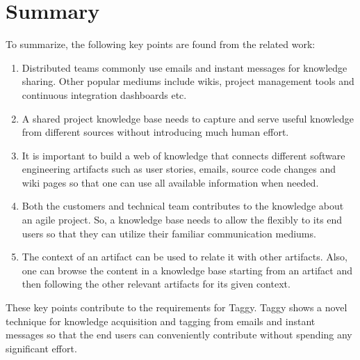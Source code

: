 \section{Summary}
To summarize, the following key points are found from the related work:
\begin{enumerate}
	\item Distributed teams commonly use emails and instant messages for knowledge sharing. Other popular mediums include wikis, project management tools and continuous integration dashboards etc.
	\item A shared project knowledge base needs to capture and serve useful knowledge from different sources without introducing much human effort.
	\item It is important to build a web of knowledge that connects different software engineering artifacts such as user stories, emails, source code changes and wiki pages so that one can use all available information when needed.
	\item Both the customers and technical team contributes to the knowledge about an agile project. So, a knowledge base needs to allow the flexibly to its end users so that they can utilize their familiar communication mediums.
	\item The context of an artifact can be used to relate it with other artifacts. Also, one can browse the content in a knowledge base starting from an artifact and then following the other relevant artifacts for its given context.
\end{enumerate}
These key points contribute to the requirements for Taggy. Taggy shows a novel technique for knowledge acquisition and tagging from emails and instant messages so that the end users can conveniently contribute without spending any significant effort.


